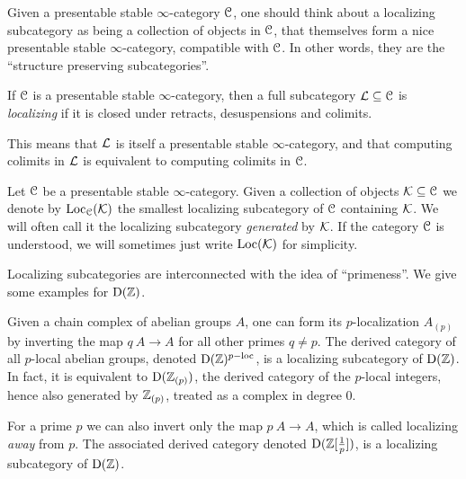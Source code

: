 Given a presentable stable $\infty$-category $\EuScript{C}$, one should think about a localizing subcategory as being a collection of objects in $\EuScript{C}$, that themselves form a nice presentable stable $\infty$-category, compatible with $\EuScript{C}$. In other words, they are the ``structure preserving subcategories''.

\begin{definition}
    \label{ch0:def:localizing-subcategory}
    If $\EuScript{C}$ is a presentable stable $\infty$-category, then a full subcategory $\mathcal{L}\subseteq \EuScript{C}$ is \emph{localizing} if it is closed under retracts, desuspensions and colimits. 
\end{definition}

This means that $\mathcal{L}$ is itself a presentable stable $\infty$-category, and that computing colimits in $\mathcal{L}$ is equivalent to computing colimits in $\EuScript{C}$. 

\begin{definition}
    Let $\EuScript{C}$ be a presentable stable $\infty$-category. Given a collection of objects $\mathcal{K}\subseteq \EuScript{C}$ we denote by $\operatorname{Loc}_{\EuScript{C}}(\mathcal{K})$ the smallest localizing subcategory of $\EuScript{C}$ containing $\mathcal{K}$. We will often call it the localizing subcategory \emph{generated} by $\mathcal{K}$. If the category $\EuScript{C}$ is understood, we will sometimes just write $\operatorname{Loc}(\mathcal{K})$ for simplicity.
\end{definition}

Localizing subcategories are interconnected with the idea of ``primeness''. We give some examples for $\mathrm{D}(\mathbb{Z})$. 

\begin{example}
    \label{ch0:ex:p-local-ab}
    Given a chain complex of abelian groups $A$, one can form its $p$-localization $A_{(p)}$ by inverting the map $q\: A\to A$ for all other primes $q\neq p$. The derived category of all $p$-local abelian groups, denoted $\mathrm{D}(\mathbb{Z})^{p-\mathrm{loc}}$, is a localizing subcategory of $\mathrm{D}(\mathbb{Z})$. In fact, it is equivalent to $\mathrm{D}(\mathbb{Z}_{(p)})$, the derived category of the $p$-local integers, hence also generated by $\mathbb{Z}_{(p)}$, treated as a complex in degree $0$. 
\end{example}

\begin{example}
    \label{ch0:ex:localizing-away-from-p}
    For a prime $p$ we can also invert only the map $p\: A\to A$, which is called localizing \emph{away} from $p$. The associated derived category denoted $\mathrm{D}(\mathbb{Z}[\frac{1}{p}])$, is a localizing subcategory of $\mathrm{D}(\mathbb{Z})$. 
\end{example}

